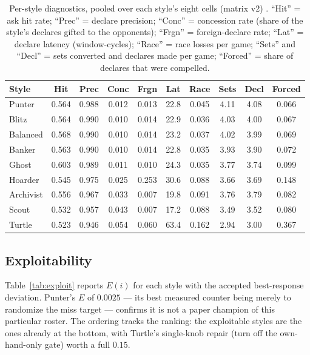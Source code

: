 \documentclass[11pt]{article}
\begin{document}
\begin{table}[t]
\centering
\caption{Per-style diagnostics, pooled over each style's eight cells (matrix v2)
\cite{artifact}. ``Hit'' = ask hit rate; ``Prec'' = declare precision; ``Conc'' =
concession rate (share of the style's declares gifted to the opponents); ``Frgn'' =
foreign-declare rate; ``Lat'' = declare latency (window-cycles); ``Race'' = race losses per
game; ``Sets'' and ``Decl'' = sets converted and declares made per game; ``Forced'' = share
of declares that were compelled.}
\label{tab:diag}
\footnotesize
\begin{tabular}{@{}lccccccccc@{}}
\toprule
Style & Hit & Prec & Conc & Frgn & Lat & Race & Sets & Decl & Forced \\
\midrule
Punter    & 0.564 & 0.988 & 0.012 & 0.013 & 22.8 & 0.045 & 4.11 & 4.08 & 0.066 \\
Blitz     & 0.564 & 0.990 & 0.010 & 0.014 & 22.9 & 0.036 & 4.03 & 4.00 & 0.067 \\
Balanced  & 0.568 & 0.990 & 0.010 & 0.014 & 23.2 & 0.037 & 4.02 & 3.99 & 0.069 \\
Banker    & 0.563 & 0.990 & 0.010 & 0.014 & 22.8 & 0.035 & 3.93 & 3.90 & 0.072 \\
Ghost     & 0.603 & 0.989 & 0.011 & 0.010 & 24.3 & 0.035 & 3.77 & 3.74 & 0.099 \\
Hoarder   & 0.545 & 0.975 & 0.025 & 0.253 & 30.6 & 0.088 & 3.66 & 3.69 & 0.148 \\
Archivist & 0.556 & 0.967 & 0.033 & 0.007 & 19.8 & 0.091 & 3.76 & 3.79 & 0.082 \\
Scout     & 0.532 & 0.957 & 0.043 & 0.007 & 17.2 & 0.088 & 3.49 & 3.52 & 0.080 \\
Turtle    & 0.523 & 0.946 & 0.054 & 0.060 & 63.4 & 0.162 & 2.94 & 3.00 & 0.367 \\
\bottomrule
\end{tabular}
\end{table}

\subsection{Exploitability}
\label{sec:exploit}

Table~\ref{tab:exploit} reports $E(i)$ for each style with the accepted best-response
deviation. Punter's $E$ of $0.0025$ --- its best measured counter being merely to randomize
the miss target --- confirms it is not a paper champion of this particular roster. The
ordering tracks the ranking: the exploitable styles are the ones already at the bottom, with
Turtle's single-knob repair (turn off the own-hand-only gate) worth a full $0.15$.
\end{document}
